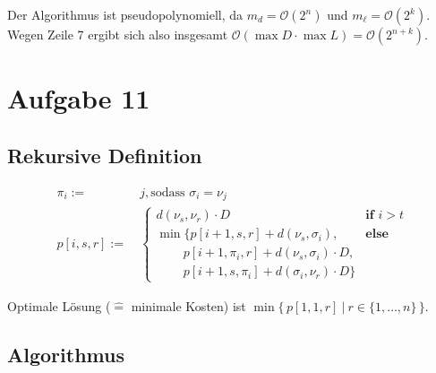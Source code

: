 Der Algorithmus ist pseudopolynomiell, da $m_d = \mathcal{O}(2^n)$ und $m_\ell = \mathcal{O}(2^k)$. \\
Wegen Zeile 7 ergibt sich also insgesamt $\mathcal{O}(\max D \cdot \max L) = \mathcal{O}(2^{n + k})$.

\section*{Aufgabe 11}
\label{sec:Aufgabe 11}

\setcounter{subsection}{0}

\subsection{Rekursive Definition}
\label{sub:Rekursive Definition}

\begin{align*}
	\pi_i := &\ j, \text{sodass } \sigma_i = \nu_j \\
	p[i, s, r] := &\ \begin{cases}
		d(\nu_s, \nu_r) \cdot D & \textbf{if } i > t \\
		\min \{ p[i + 1, s, r] + d(\nu_s, \sigma_i), & \textbf{else} \\
		\qquad\, p[i + 1, \pi_i, r] + d(\nu_s, \sigma_i) \cdot D, \\
		\qquad\, p[i + 1, s, \pi_i] + d(\sigma_i, \nu_r) \cdot D \}
	\end{cases}
\end{align*}

Optimale Lösung ($\hat{=}$ minimale Kosten) ist $\min \{ \, p[1, 1, r]\ |\ r \in \{ 1, \dots, n \} \, \}$.

\subsection{Algorithmus}
\label{sub:Algorithmus}


